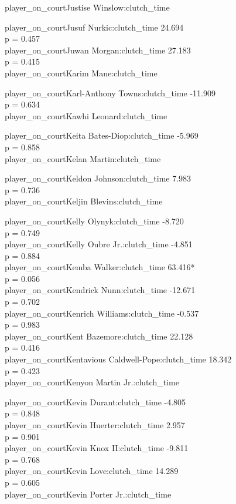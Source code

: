\documentclass[
  landscape]{article}
\begin{document}
player\_on\_courtJustise Winslow:clutch\_time

player\_on\_courtJusuf Nurkic:clutch\_time 24.694\\
p = 0.457\\
player\_on\_courtJuwan Morgan:clutch\_time 27.183\\
p = 0.415\\
player\_on\_courtKarim Mane:clutch\_time

player\_on\_courtKarl-Anthony Towns:clutch\_time -11.909\\
p = 0.634\\
player\_on\_courtKawhi Leonard:clutch\_time

player\_on\_courtKeita Bates-Diop:clutch\_time -5.969\\
p = 0.858\\
player\_on\_courtKelan Martin:clutch\_time

player\_on\_courtKeldon Johnson:clutch\_time 7.983\\
p = 0.736\\
player\_on\_courtKeljin Blevins:clutch\_time

player\_on\_courtKelly Olynyk:clutch\_time -8.720\\
p = 0.749\\
player\_on\_courtKelly Oubre Jr.:clutch\_time -4.851\\
p = 0.884\\
player\_on\_courtKemba Walker:clutch\_time 63.416*\\
p = 0.056\\
player\_on\_courtKendrick Nunn:clutch\_time -12.671\\
p = 0.702\\
player\_on\_courtKenrich Williams:clutch\_time -0.537\\
p = 0.983\\
player\_on\_courtKent Bazemore:clutch\_time 22.128\\
p = 0.416\\
player\_on\_courtKentavious Caldwell-Pope:clutch\_time 18.342\\
p = 0.423\\
player\_on\_courtKenyon Martin Jr.:clutch\_time

player\_on\_courtKevin Durant:clutch\_time -4.805\\
p = 0.848\\
player\_on\_courtKevin Huerter:clutch\_time 2.957\\
p = 0.901\\
player\_on\_courtKevin Knox II:clutch\_time -9.811\\
p = 0.768\\
player\_on\_courtKevin Love:clutch\_time 14.289\\
p = 0.605\\
player\_on\_courtKevin Porter Jr.:clutch\_time
\end{document}
